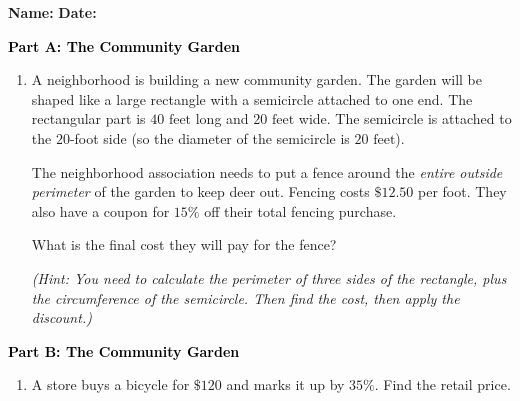 \documentclass[12pt, letterpaper, fleqn]{article}
\newcommand{\blank}{\underline{\hspace{2.2cm}}}
\begin{document}
\textbf{Name:} \underline{\hspace{5cm}}
\hfill
\textbf{Date:} \underline{\hspace{3cm}}\\

\begin{tcolorbox}[colback=customteal!20]
\large\textcolor{black}{\textbf{Part A: The Community Garden}}
\end{tcolorbox}

\vspace{3mm}

\begin{enumerate}[itemsep=2.5cm, leftmargin=0.6cm]
\item A neighborhood is building a new community garden. The garden will be shaped like a large rectangle with a semicircle attached to one end. The rectangular part is $40\text{ feet}$ long and $20\text{ feet}$ wide. The semicircle is attached to the $20$-foot side (so the diameter of the semicircle is $20\text{ feet}$).

The neighborhood association needs to put a fence around the \textit{entire outside perimeter} of the garden to keep deer out. Fencing costs $\$12.50$ per foot. They also have a coupon for $15\%$ off their total fencing purchase. 

What is the final cost they will pay for the fence?

\textit{(Hint: You need to calculate the perimeter of three sides of the rectangle, plus the circumference of the semicircle. Then find the cost, then apply the discount.)}
\end{enumerate}

\newpage

\begin{tcolorbox}[colback=customteal!20]
\large\textcolor{black}{\textbf{Part B: The Community Garden}}
\end{tcolorbox}

\vspace{3mm}

\begin{enumerate}[itemsep=2.5cm, leftmargin=0.6cm, resume]
\item A store buys a bicycle for $\$120$ and marks it up by $35\%$. Find the retail price. \blank
\end{enumerate}
\end{document}
